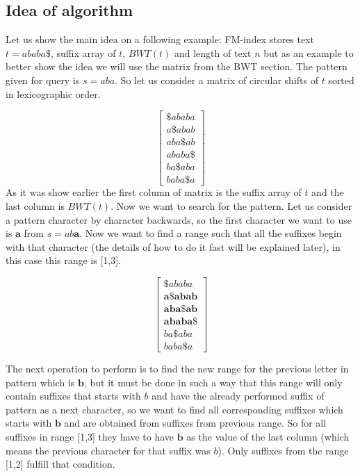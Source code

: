 \subsection{Idea of algorithm}
\label{subsection:IdeaOfFMAlgo}

Let us show the main idea on a following example: FM-index stores text $t = ababa\$$, suffix array of $t$, $BWT(t)$ and length of text $n$ but as an example to better show the idea we will use the matrix from the BWT section. The pattern given for query is $s = aba$. So let us consider a matrix of circular shifts of $t$ sorted in lexicographic order.

$$
\begin{bmatrix}
\$ababa\\
a\$abab\\
aba\$ab\\
ababa\$\\
ba\$aba\\
baba\$a
\end{bmatrix}
$$
\newline
As it was show earlier the first column of matrix is the suffix array of $t$ and the last column is $BWT(t)$. Now we want to search for the pattern. Let us consider a pattern character by character backwards, so the first character we want to use is $\textbf{a}$ from $s = ab\textbf{a}$. Now we want to find a range such that all the suffixes begin with that character (the details of how to do it fast will be explained later), in this case this range is [1,3].

$$
\begin{bmatrix}
\$ababa\\
\textbf{a\$abab}\\
\textbf{aba\$ab}\\
\textbf{ababa\$}\\
ba\$aba\\
baba\$a
\end{bmatrix}
$$

The next operation to perform is to find the new range for the previous letter in pattern which is $\textbf{b}$, but it must be done in such a way that this range will only contain suffixes that starts with $b$ and have the already performed suffix of pattern as a next character, so we want to find all corresponding suffixes which starts with $\textbf{b}$ and are obtained from suffixes from previous range. So for all suffixes in range [1,3] they have to have $\textbf{b}$ as the value of the last column (which means the previous character for that suffix was $b$). Only suffixes from the range [1,2] fulfill that condition.

